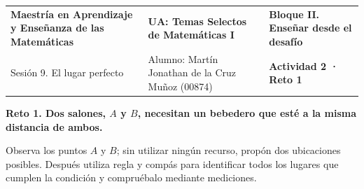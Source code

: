 \documentclass[spanish,letterpaper,landscape]{article}
\begin{document}
\color{iiiepeInk}

\noindent
\begin{tabularx}{\textwidth}{@{} >{\raggedright\arraybackslash}p{} >{\centering\arraybackslash}X >{\raggedleft\arraybackslash}p{} @{}}
\footnotesize \textbf{Maestría en Aprendizaje y Enseñanza de las Matemáticas} &
\footnotesize \textbf{UA: Temas Selectos de Matemáticas I} &
\footnotesize \textbf{Bloque II. Enseñar desde el desafío} \\
\footnotesize Sesión 9. El lugar perfecto &
\footnotesize Alumno: Martín Jonathan de la Cruz Muñoz (00874) &
\footnotesize \textbf{Actividad 2 · Reto 1}
\end{tabularx}

\vspace{4pt}
\begin{center}
  {\normalsize\bfseries Reto 1. Dos salones, $A$ y $B$, necesitan un bebedero que esté a la misma distancia de ambos.}
\end{center}
\vspace{2pt}
{\small Observa los puntos $A$ y $B$; sin utilizar ningún recurso, propón dos ubicaciones posibles. Después utiliza regla y compás para identificar todos los lugares que cumplen la condición y compruébalo mediante mediciones.}
\end{document}
